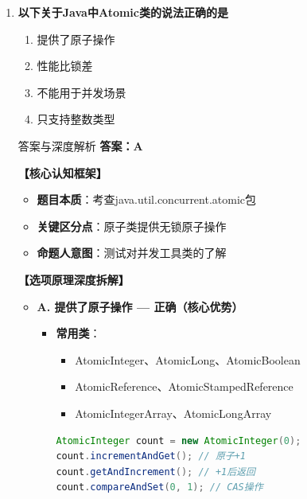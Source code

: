 \documentclass[12pt, a4paper]{ctexart}
\begin{document}
\begin{enumerate}[label=\textbf{\arabic*.}]
\begin{bluebox}{答案与深度解析}
		      \textbf{考场秒杀技巧}：volatile保可见，不保原子，不能替代锁
	      \end{bluebox}

	\item \textbf{以下关于Java中Atomic类的说法正确的是}
	      \begin{enumerate}[label=\Alph*.]
		      \item 提供了原子操作
		      \item 性能比锁差
		      \item 不能用于并发场景
		      \item 只支持整数类型
	      \end{enumerate}

	      \begin{bluebox}{答案与深度解析}
		      \textbf{答案：A}

		      \textbf{【核心认知框架】}
		      \begin{itemize}[label={}, leftmargin=*, nosep]
			      \item \textbf{题目本质}：考查java.util.concurrent.atomic包
			      \item \textbf{关键区分点}：原子类提供无锁原子操作
			      \item \textbf{命题人意图}：测试对并发工具类的了解
		      \end{itemize}

		      \textbf{【选项原理深度拆解】}
					  \begin{itemize}[label={}, leftmargin=*, nosep]

		      \item \textbf{A. 提供了原子操作 — 正确（核心优势）}
		      \begin{itemize}[label={}, leftmargin=*, nosep]
			      \item \textbf{常用类}：
			            \begin{itemize}[label={}, nosep]
				            \item AtomicInteger、AtomicLong、AtomicBoolean
				            \item AtomicReference、AtomicStampedReference
				            \item AtomicIntegerArray、AtomicLongArray
			            \end{itemize}
			            \begin{lstlisting}[language=Java]
AtomicInteger count = new AtomicInteger(0);
count.incrementAndGet(); // 原子+1
count.getAndIncrement(); // +1后返回
count.compareAndSet(0, 1); // CAS操作
      \end{lstlisting}
		      \end{itemize}


\end{itemize}
\end{bluebox}
\end{enumerate}
\end{document}
